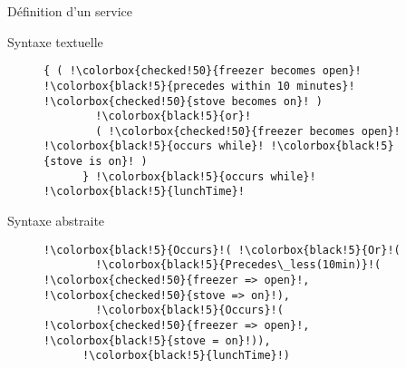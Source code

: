 \begin{frame}[fragile]{Définition d'un service}
\addtocounter{framenumber}{-1}

  \begin{coloredbox}[black]{Syntaxe textuelle}
  \begin{figure}[h]
    \begin{lstlisting}[language=MaloyaText,basicstyle=\ttfamily\footnotesize,escapechar=!]
      { ( !\colorbox{checked!50}{freezer becomes open}! !\colorbox{black!5}{precedes within 10 minutes}! !\colorbox{checked!50}{stove becomes on}! )
        !\colorbox{black!5}{or}!
        ( !\colorbox{checked!50}{freezer becomes open}! !\colorbox{black!5}{occurs while}! !\colorbox{black!5}{stove is on}! ) 
      } !\colorbox{black!5}{occurs while}! !\colorbox{black!5}{lunchTime}!
    \end{lstlisting}
  \end{figure}
\end{coloredbox}
 \begin{coloredbox}[black]{Syntaxe abstraite}
  \begin{figure}[!h]
    \begin{lstlisting}[language=Maloya,basicstyle=\ttfamily\footnotesize,escapechar=!]
      !\colorbox{black!5}{Occurs}!( !\colorbox{black!5}{Or}!(
        !\colorbox{black!5}{Precedes\_less(10min)}!( !\colorbox{checked!50}{freezer => open}!, !\colorbox{checked!50}{stove => on}!),
        !\colorbox{black!5}{Occurs}!( !\colorbox{checked!50}{freezer => open}!, !\colorbox{black!5}{stove = on}!)),
      !\colorbox{black!5}{lunchTime}!)
    \end{lstlisting}
  \end{figure}
\end{coloredbox}
\end{frame}

